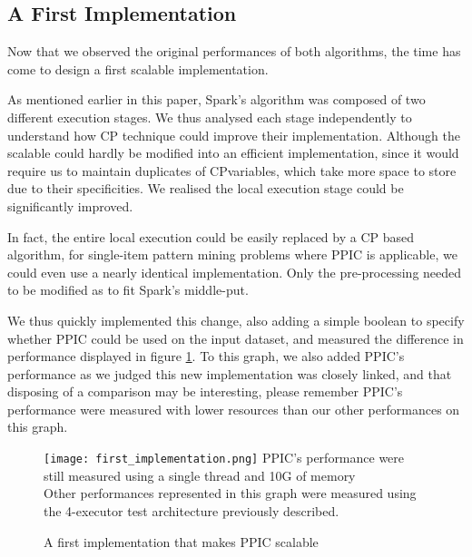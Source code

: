 \documentclass{eplmastersthesis}
\newcommand\danger{%
 \makebox[1.4em][c]{%
 \makebox[0pt][c]{\raisebox{.1em}{\small!}}%
 \makebox[0pt][c]{\color{red}\Large$\bigtriangleup$}}}%
\begin{document}
\subsection{A First Implementation}

Now that we observed the original performances of both algorithms, the time has come to design a first scalable implementation. \newline

As mentioned earlier in this paper, Spark's algorithm was composed of two different execution stages. We thus analysed each stage independently to understand how CP technique could improve their implementation. Although the scalable could hardly be modified into an efficient implementation, since it would require us to maintain duplicates of CPvariables, which take more space to store due to their specificities. We realised the local execution stage could be significantly improved. \newline

In fact, the entire local execution could be easily replaced by a CP based algorithm, for single-item pattern mining problems where PPIC is applicable, we could even use a nearly identical implementation. Only the pre-processing needed to be modified as to fit Spark's middle-put. \newline

We thus quickly implemented this change, also adding a simple boolean to specify whether PPIC could be used on the input dataset, and measured the difference in performance displayed in figure \ref{fig:first_scalable_CPbased_implementation}. To this graph, we also added PPIC's performance as we judged this new implementation was closely linked, and that disposing of a comparison may be interesting, please remember PPIC's performance were measured with lower resources than our other performances on this graph.  \newline

\begin{figure}[h]
  \centering
  \texttt{[image: first\_implementation.png]}
  \danger PPIC's performance were still measured using a single thread and 10G of memory \danger \\
  Other performances represented in this graph were measured using the 4-executor test architecture previously described.
  \caption{A first implementation that makes PPIC scalable}
  \label{fig:first_scalable_CPbased_implementation}
\end{figure}
\end{document}
